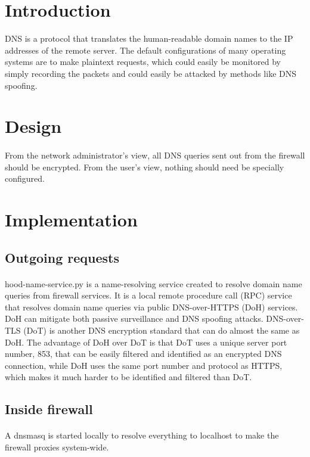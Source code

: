 \documentclass[mscthesis]{usiinfthesis}
\begin{document}
\section{Introduction}
DNS is a protocol that translates the human-readable domain names to the IP addresses of the remote server. The default configurations of many operating systems are to make plaintext requests, which could easily be monitored by simply recording the packets and could easily be attacked by methods like DNS spoofing.

\section{Design}
\paragraph{}
From the network administrator's view, all DNS queries sent out from the firewall should be encrypted. From the user's view, nothing should need be specially configured.

\section{Implementation}
\subsection{Outgoing requests}
\paragraph{}
hood-name-service.py is a name-resolving service created to resolve domain name queries from firewall services. It is a local remote procedure call (RPC) service that resolves domain name queries via public DNS-over-HTTPS (DoH) services. DoH can mitigate both passive surveillance and DNS spoofing attacks\citep{rfc:doh8}. DNS-over-TLS (DoT) is another DNS encryption standard that can do almost the same as DoH. The advantage of DoH over DoT is that DoT uses a unique server port number, 853, that can be easily filtered and identified as an encrypted DNS connection, while DoH uses the same port number and protocol as HTTPS, which makes it much harder to be identified and filtered than DoT.
\subsection{Inside firewall}
\paragraph{}
A dnsmasq is started locally to resolve everything to localhost to make the firewall proxies system-wide.
\end{document}
